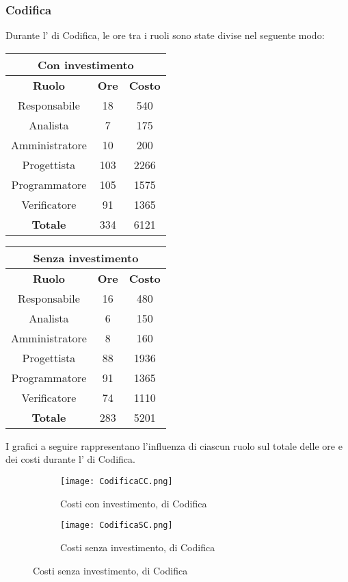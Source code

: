 \documentclass{scalatekids-article}
\begin{document}
\subsubsection{Codifica}
Durante l' di Codifica, le ore tra i ruoli sono state divise nel seguente modo:
\begin{center}
  \normalsize
  \begin{tabular}{| c | c | c |}
    \hline
    \multicolumn{3}{|c|}{\textbf{Con investimento}}\\
    \hline
    \textbf{Ruolo} & \textbf{Ore} & \textbf{Costo}\\
    \hline
    Responsabile & 18 & 540 \\
    Analista & 7 & 175\\
    Amministratore & 10 & 200\\
    Progettista & 103 & 2266\\
    Programmatore & 105 & 1575\\
    Verificatore & 91 & 1365\\
    \hline
    \textbf{Totale} & 334 & 6121\\
    \hline
  \end{tabular}
  \qquad
  \begin{tabular}{| c | c | c |}
    \hline
    \multicolumn{3}{|c|}{\textbf{Senza investimento}}\\
    \hline
    \textbf{Ruolo} & \textbf{Ore} & \textbf{Costo}\\
    \hline
    Responsabile & 16 & 480\\
    Analista & 6 & 150\\
    Amministratore & 8 & 160\\
    Progettista & 88 & 1936\\
    Programmatore & 91 & 1365\\
    Verificatore & 74 & 1110\\
    \hline
    \textbf{Totale} & 283 & 5201\\
    \hline
  \end{tabular}
\end{center}
I grafici a seguire rappresentano l'influenza di ciascun ruolo sul totale delle ore e dei costi durante l' di Codifica.
\begin{figure}[H]
  \begin{subfigure}[H]{0.47\textwidth}
    \texttt{[image: CodificaCC.png]}
    \caption{Costi con investimento,  di Codifica}
  \end{subfigure}
  \qquad
  \begin{subfigure}[H]{0.47\textwidth}
    \texttt{[image: CodificaSC.png]}
    \caption{Costi senza investimento,  di Codifica}
  \end{subfigure}
\end{figure}
\newpage
\end{document}
